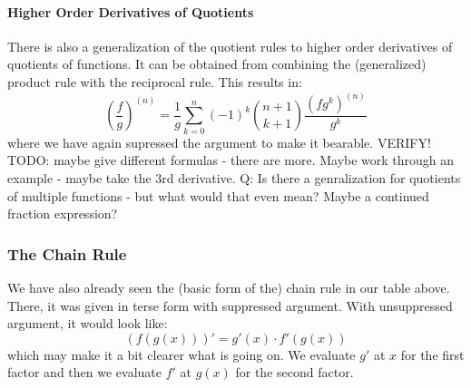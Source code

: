 
\paragraph{Higher Order Derivatives of Quotients}
There is also a generalization of the quotient rules to higher order derivatives of quotients of functions. It can be obtained from combining the (generalized) product rule with the reciprocal rule. This results in:
\begin{equation}
\left( \frac{f}{g} \right) ^{(n)} = 
\frac{1}{g} \sum_{k=0}^{n} (-1)^k \binom{n+1}{k+1} \frac{(f g^k)^{(n)}}{g^k}
\end{equation}
where we have again supressed the argument to make it bearable. VERIFY! TODO: maybe give different formulas - there are more. Maybe work through an example - maybe take the 3rd derivative. Q: Is there a genralization for quotients of multiple functions - but what would that even mean? Maybe a continued fraction expression?

%
%
%
% 



\subsubsection{The Chain Rule}
We have also already seen the (basic form of the) chain rule in our table above. There, it was given in terse form with suppressed argument. With unsuppressed argument, it would look like:
\begin{equation}
 (f( g(x)))' = g'(x) \cdot f'(g(x))
\end{equation}
which may make it a bit clearer what is going on. We evaluate $g'$ at $x$ for the first factor and then we evaluate $f'$ at $g(x)$ for the second factor.

